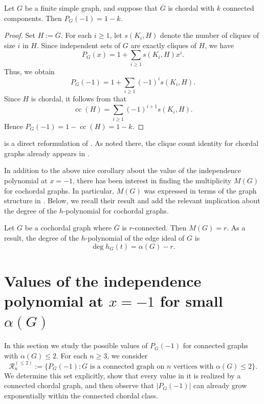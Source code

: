\documentclass[12pt]{amsart}
\theoremstyle{plain}
\theoremstyle{definition}
\begin{document}
\begin{cor}\label{cor:cochordal-k-components-minus-one}
Let \(G\) be a finite simple graph, and suppose that \(\overline{G}\) is chordal with
\(k\) connected components. Then \(P_G(-1)=1-k\).
\end{cor}

\begin{proof}
Set \(H:=\overline{G}\). For each \(i\ge 1\), let \(s(K_i,H)\) denote the number of
cliques of size \(i\) in \(H\). Since independent sets of \(G\) are exactly cliques of
\(H\), we have
\[
P_G(x)=1+\sum_{i\ge 1}s(K_i,H)x^i.
\]
Thus, we obtain
\[
P_G(-1)=1+\sum_{i\ge 1}(-1)^i s(K_i,H).
\]
Since \(H\) is chordal, it follows from \cite[Lemma 2]{Klusowski_chordal_clique} that
\[
\operatorname{cc}(H)=\sum_{i\ge 1}(-1)^{i+1}s(K_i,H).
\]
Hence \(P_G(-1)=1-\operatorname{cc}(H)=1-k\).
\end{proof}

\begin{remark}
 is a direct reformulation of
\cite[Lemma 2]{Klusowski_chordal_clique}. As noted there, the clique count identity for
chordal graphs already appears in \cite[Exercise 5.3.22]{West_graph_theory_book}. 
\end{remark}



In addition to the above nice corollary about the value of the independence polynomial at $x=-1$, there has been interest in finding the multiplicity $M(G)$ for cochordal graphs. In particular, $M(G)$ was expressed in terms of the graph structure in \cite{Chordal_multiplicity}. Below, we recall their result and add the relevant implication about the degree of the $h$-polynomial for cochordal graphs.  

\begin{cor}\cite[Corollary 2.8]{Chordal_multiplicity}
 Let $G$ be a cochordal graph where $\overline{G}$ is $r$-connected. Then $M(G)=r$.  As a result, the degree of the $h$-polynomial of the edge ideal of $G$ is 
 $$\deg h_{G} (t)=\alpha(G)-r.$$
\end{cor}



\section{Values of the independence polynomial at $x=-1$ for small $\alpha(G)$}

In this section we study the possible values of \(P_G(-1)\) for connected graphs with \(\alpha(G)\leq 2\). For each \(n\geq 3\), we consider
\[
\mathcal R_n^{(\leq 2)}
:=
\{ P_G(-1): G \text{ is a connected graph on } n \text{ vertices with }
\alpha(G)\leq 2 \}.
\]
We determine this set explicitly, show that every value in it is realized by a connected chordal graph, and then observe that \(|P_G(-1)|\) can already grow exponentially within the connected chordal class.
\end{document}

